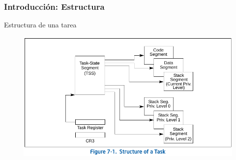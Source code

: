 \documentclass[aspectratio=169]{beamer}
\begin{document}
\begin{frame}
\frametitle{Introducci\'on: Estructura}
    \begin{center}Estructura de una tarea\end{center}
    \vspace{-0.5cm}
    \begin{figure}[ht!]
    \centering
    \includegraphics[scale=0.9]{img/Structure_Task.pdf}
    \end{figure}
\end{frame}
\end{document}
